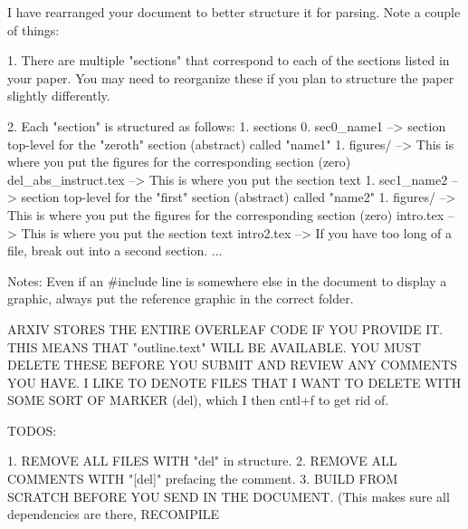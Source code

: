 I have rearranged your document to better structure it for parsing. Note a couple of things: 

1. There are multiple "sections" that correspond to each of the sections listed in your paper. You may need to reorganize these if you plan to structure the paper slightly differently.

2. Each "section" is structured as follows:
    1. sections
        0. sec0\_name1 --> section top-level for the "zeroth" section (abstract) called "name1"
            1. figures/ --> This is where you put the figures for the corresponding section (zero)
            del\_abs\_instruct.tex --> This is where you put the section text
        1. sec1\_name2 --> section top-level for the "first" section (abstract) called "name2"
            1. figures/ --> This is where you put the figures for the corresponding section (zero)
            intro.tex --> This is where you put the section text
            intro2.tex --> If you have too long of a file, break out into a second section.
        ...

Notes: Even if an #include line is somewhere else in the document to display a graphic, always put the reference graphic in the correct folder.

ARXIV STORES THE ENTIRE OVERLEAF CODE IF YOU PROVIDE IT. THIS MEANS THAT "outline.text" WILL BE AVAILABLE. YOU MUST DELETE THESE BEFORE YOU SUBMIT AND REVIEW ANY COMMENTS YOU HAVE. I LIKE TO DENOTE FILES THAT I WANT TO DELETE WITH SOME SORT OF MARKER (del), which I then cntl+f to get rid of.

TODOS:

1. REMOVE ALL FILES WITH "del" in structure.
2. REMOVE ALL COMMENTS WITH "[del]" prefacing the comment.
3. BUILD FROM SCRATCH BEFORE YOU SEND IN THE DOCUMENT. (This makes sure all dependencies are there, RECOMPILE 
        
